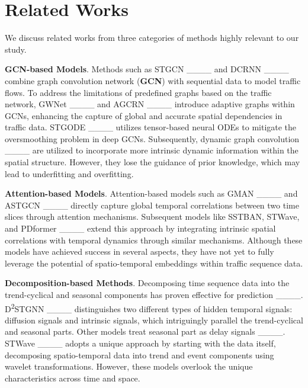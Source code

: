 \section{Related Works}
We discuss related works from three categories of methods highly relevant to our study. %

\textbf{GCN-based Models}. Methods such as STGCN ____ and DCRNN ____ combine graph convolution network (\textbf{GCN}) with sequential data to model traffic flows. To address the limitations of predefined graphs based on the traffic network, GWNet ____ and AGCRN ____ introduce adaptive graphs within GCNs, enhancing the capture of global and accurate spatial dependencies in traffic data. STGODE ____ utilizes tensor-based neural ODEs to mitigate the oversmoothing problem in deep GCNs. Subsequently, dynamic graph convolution ____ are utilized to incorporate more intrinsic dynamic information within the spatial structure. However, they lose the guidance of prior knowledge, which may lead to underfitting and overfitting.

\textbf{Attention-based Models}. Attention-based models such as GMAN ____ and ASTGCN ____ directly capture global temporal correlations between two time slices through attention mechanisms. Subsequent models like SSTBAN, STWave, and PDformer ____ extend this approach by integrating intrinsic spatial correlations with temporal dynamics through similar mechanisms. Although these models have achieved success in several aspects, they have not yet to fully leverage the potential of spatio-temporal embeddings within traffic sequence data.

\textbf{Decomposition-based Methods}. Decomposing time sequence data into the trend-cyclical and seasonal components has proven effective for prediction ____. D\textsuperscript{2}STGNN ____ distinguishes two different types of hidden temporal signals: diffusion signals and intrinsic signals, which intriguingly parallel the trend-cyclical and seasonal parts. Other models treat seasonal part as delay signals ____. STWave ____ adopts a unique approach by starting with the data itself, decomposing spatio-temporal data into trend and event components using wavelet transformations. However, these models overlook the unique characteristics across time and space.


